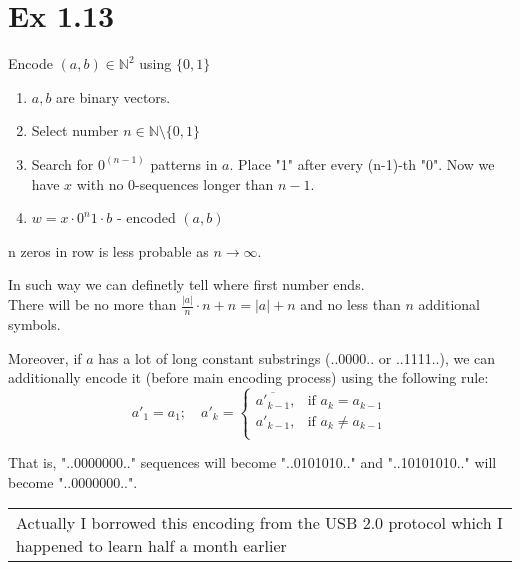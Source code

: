 \section*{Ex 1.13}
\begin{mdframed}
	Encode $(a,b) \in \mathbb N ^ 2$ using $\{0,1\}$
\end{mdframed}

\begin{enumerate}
	\item $a, b$ are binary vectors. 
	\item Select number $n\in \mathbb{N}\setminus \{0,1\}$
	\item Search for $0^(n-1)$ patterns in $a$. Place "1" after every (n-1)-th "0". Now we have $x$ with no 0-sequences longer than $n-1$.
	\item $w = x \cdot 0^n 1 \cdot b$ - encoded $(a,b)$
\end{enumerate}

n zeros in row is less probable as $n \to \infty$. 

In such way we can definetly tell where first number ends. \\
There will be no more than $\frac{|a|}{n} \cdot n + n = |a| + n$ and no less than $n$ additional symbols.

Moreover, if $a$ has a lot of long constant substrings (..0000.. or ..1111..), 
we can additionally encode it (before main encoding process) using the following rule:
$$a'_1 = a_1; \quad a'_k = \begin{cases}
	\overline{a'_{k-1}}, & \text{if } a_k = a_{k-1} \\
	a'_{k-1}, & \text{if } a_k \ne a_{k-1} \\
\end{cases} $$

That is, "..0000000.." sequences will become "..0101010.." and "..10101010.." will become "..0000000..". 

\begin{tabular}{|p{10cm}}
	Actually I borrowed this encoding from the USB 2.0 protocol 
	which I happened to learn half a month earlier 
\end{tabular}

